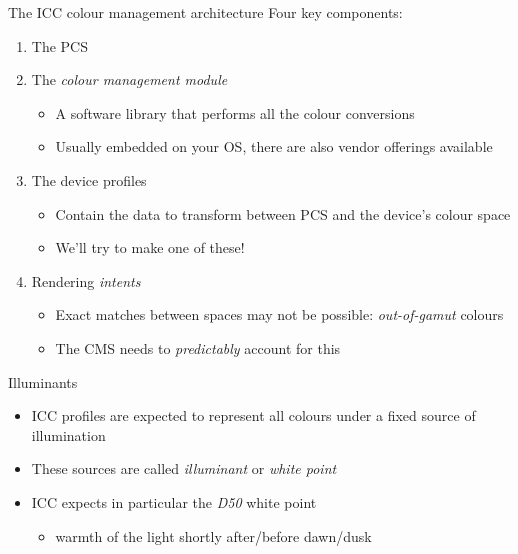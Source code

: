 \documentclass[aspectratio=169,handout]{fireshonks}
\begin{document}
\begin{frame}{The ICC colour management architecture}
  Four key components:
  \begin{enumerate}[<+(1)->]
    \item The PCS
    \item The \emph{colour management module}
          \begin{itemize}
            \item A software library that performs all the colour conversions
            \item Usually embedded on your OS, there are also vendor offerings available
          \end{itemize}
    \item The device profiles
          \begin{itemize}
            \item Contain the data to transform between PCS and the device's colour space
            \item {} We'll try to make one of these!
          \end{itemize}
    \item Rendering \emph{intents}
          \begin{itemize}
            \item Exact matches between spaces may not be possible: \emph{out-of-gamut} colours
            \item The CMS needs to \emph{predictably} account for this
          \end{itemize}
  \end{enumerate}
\end{frame}
\begin{frame}{Illuminants}
  \begin{itemize}
    \item ICC profiles are expected to represent all colours under a fixed source of illumination
    \item These sources are called \emph{illuminant} or \emph{white point}
    \item ICC expects in particular the \emph{D50} white point
          \begin{itemize}
            \item warmth of the light shortly after/before dawn/dusk \autocite{tooms}
          \end{itemize}
  \end{itemize}
\end{frame}
\end{document}
